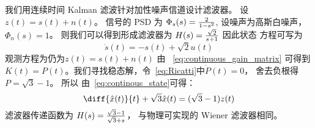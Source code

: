 \documentclass{ctexart}
\begin{document}
我们用连续时间 Kalman 滤波针对加性噪声信道设计滤波器。
设 $ z(t) = s(t) + n(t)$。 信号的 PSD 为 $ \Phi_s(s) = { 2 \over 1-s^2}$, 设噪声为高斯白噪声， $\Phi_n(s) = 1 $。 则我们可以得到形成滤波器为
$ H(s) = { \sqrt{2} \over s+1}$ 因此状态 方程可写为 
$$ 
\dot s(t) = -s(t) + \sqrt{2} u(t) 
$$
观测方程为仍为$ z(t) = s(t) + n(t)$
由 ~\eqref{eq:continuous_gain_matrix} 可得到 $ K(t) = P(t)$。我们寻找稳态解，令~\eqref{eq:Ricatti}中$\dot P(t) = 0$， 舍去负根得 $ P = \sqrt{3} - 1 $。 所以
由~\eqref{eq:continous_state}可得：
$$
\diff{\hat{x}(t)}{t} + \sqrt{3} \hat{x}(t) = (\sqrt{3} - 1) z(t)
$$
滤波器传递函数为  $H(s) = { \sqrt{3} - 1 \over \sqrt{3} + s } $， 与物理可实现的 Wiener 滤波器相同。
\end{document}
